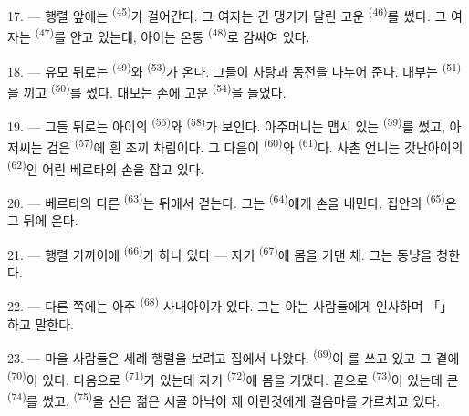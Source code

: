 \VUsaut{5.0mm}
\VUsaut{4.0mm}

17. --- 행렬 앞에는  \textsuperscript{(45)}가 걸어간다. 그 여자는 긴 댕기가
달린 고운  \textsuperscript{(46)}를 썼다. 그 여자는 
\textsuperscript{(47)}를 안고 있는데, 아이는 온통  \textsuperscript{(48)}로
감싸여 있다.

18. --- 유모 뒤로는  \textsuperscript{(49)}와 
\textsuperscript{(53)}가 온다. 그들이 사탕과 동전을 나누어 준다. 대부는 
\textsuperscript{(51)}을 끼고  \textsuperscript{(50)}를 썼다. 대모는
손에 고운  \textsuperscript{(54)}을 들었다.

19. --- 그들 뒤로는 아이의  \textsuperscript{(56)}와
 \textsuperscript{(58)}가 보인다. 아주머니는 맵시 있는 
\textsuperscript{(59)}를 썼고, 아저씨는 검은  \textsuperscript{(57)}에
흰 조끼 차림이다. 그 다음이  \textsuperscript{(60)}와
 \textsuperscript{(61)}다. 사촌 언니는 갓난아이의 
\textsuperscript{(62)}인 어린 베르타의 손을 잡고 있다.

20. --- 베르타의 다른  \textsuperscript{(63)}는 뒤에서 걷는다. 그는
 \textsuperscript{(64)}에게 손을 내민다. 집안의 
\textsuperscript{(65)}은 그 뒤에 온다.

\VUsaut{4.6mm}
\VUsaut{3.4mm}

21. --- 행렬 가까이에  \textsuperscript{(66)}가 하나 있다 — 자기
 \textsuperscript{(67)}에 몸을 기댄 채. 그는 동냥을 청한다.

22. --- 다른 쪽에는 아주  \textsuperscript{(68)} 사내아이가 있다.
그는 아는 사람들에게 인사하며 「」 하고 말한다.

23. --- 마을 사람들은 세례 행렬을 보려고 집에서 나왔다. 
\textsuperscript{(69)}이 를 쓰고 있고 그 곁에 
\textsuperscript{(70)}이 있다. 다음으로  \textsuperscript{(71)}가 있는데
자기  \textsuperscript{(72)}에 몸을 기댔다. 끝으로 
\textsuperscript{(73)}이 있는데 큰  \textsuperscript{(74)}를 썼고,
 \textsuperscript{(75)}을 신은 젊은 시골 아낙이 제 어린것에게 걸음마를
가르치고 있다.


